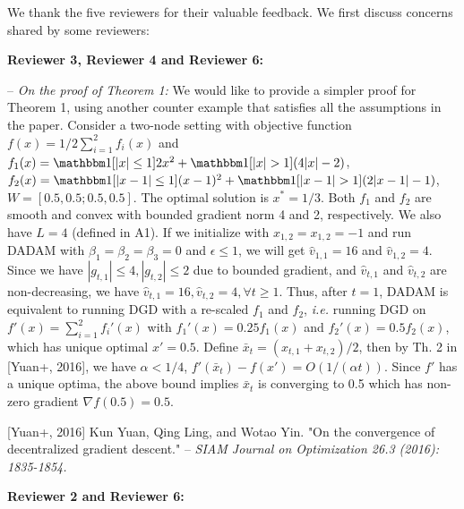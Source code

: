 \documentclass{article}
\begin{document}
We thank the five reviewers for their valuable feedback. We first discuss concerns shared by some reviewers:
\vspace{-2pt}

\textbf{Reviewer 3, Reviewer 4 and Reviewer 6:} \vspace{-5pt}

-- \textit{On the proof of Theorem 1:} We would like to provide a simpler proof for Theorem 1, using another counter example that satisfies all the assumptions in the paper. Consider a two-node setting with objective function $f(x) =1/2 \sum_{i=1}^2 f_i(x)$ and $f_1(x) =  \mathbbm 1[|x|\leq 1] 2x^2 +  \mathbbm 1[|x|> 1] (4|x|-2)$, $f_2(x) =  \mathbbm 1[|x-1|\leq 1](x-1)^2 + \mathbbm 1[|x-1| > 1] (2|x-1|-1)$, $W = [0.5,0.5;0.5,0.5]$. The optimal solution is $x^* = 1/3$.
Both $f_1$ and $f_2$ are smooth and convex with bounded gradient norm 4 and 2, respectively. 
We also have $L = 4$ (defined in A1). 
If we initialize with $x_{1,2} = x_{1,2} = -1$ and run DADAM with $\beta_1 = \beta_2 =\beta_3 = 0$ and $\epsilon \leq 1$, we will get $\hat v_{1,1} = 16$ and $\hat v_{1,2} = 4$. 
Since we have $|g_{t,1}| \leq 4, |g_{t,2}| \leq 2$ due to bounded gradient, and $\hat v_{t,1}$ and $\hat v_{t,2}$ are non-decreasing, we have $\hat v_{t,1} = 16, \hat v_{t,2}=4, \forall t \geq 1$. 
Thus, after $t=1$, DADAM is equivalent to running DGD with a re-scaled $f_1$ and $f_2$, \textit{i.e.} running DGD on
$f'(x) = \sum_{i=1}^2 f_i'(x)$ with $f_1'(x) =  0.25 f_1(x)$ and $f_2'(x) = 0.5  f_2(x)$, which has unique optimal $x'=0.5$. 
Define $\bar x_t = (x_{t,1}+x_{t,2})/2$, then by Th. 2 in [Yuan+, 2016], we have $\alpha < 1/4$, $f'(\bar x_t) - f(x') = O(1/(\alpha t))$. 
Since $f'$ has a unique optima, the above bound implies $\bar x_t$ is converging to 0.5 which has non-zero gradient $\nabla f(0.5) = 0.5$.\vspace{-5pt}

[Yuan+, 2016]  Kun Yuan, Qing Ling, and Wotao Yin. "On the convergence of decentralized gradient descent." -- \textit{SIAM Journal on Optimization 26.3 (2016): 1835-1854.}

\vspace{-2pt}

\textbf{Reviewer 2 and Reviewer 6:} \vspace{-5pt}
\end{document}
